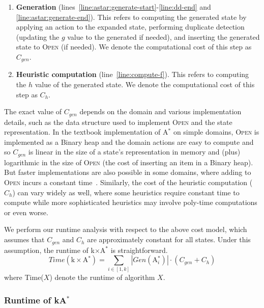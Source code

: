\documentclass{aicom2e}
\newcommand{\astar}{A$^*$}
\newcommand{\kastar}{kA$^*$}
\newcommand{\kxastar}{k$\times$A$^*$}
\newcommand{\astari}[1]{A$^*_#1$}
\newcommand{\open}{\textsc{Open}}
\begin{document}
\begin{enumerate}
    \item {\bf Generation}  (lines~\ref{line:astar:generate-start}-\ref{line:dd-end} and \ref{line:astar:generate-end}).
    This refers to computing the generated state by applying an action to the expanded state,
    performing duplicate detection (updating the $g$ value to the generated if needed),
    and inserting the generated state to \open{} (if needed).
    We denote the computational cost of this step as $C_{gen}$.


    \item {\bf Heuristic computation}  (line~\ref{line:compute-f}). This refers to computing the $h$ value of the generated state.
    We denote the computational cost of this step as $C_{h}$.
\end{enumerate}

The exact value of $C_{gen}$ depends on the domain and various implementation
details, such as the data structure used to implement \open{} and the state
representation. In the textbook implementation of \astar{} on simple domains,
\open{} is implemented as a Binary heap and the domain actions are easy to
compute and so $C_{gen}$ is linear in the size  of a state's representation in
memory and (plus) logarithmic in the size of \open{} (the cost of inserting an
item in a Binary heap). But faster implementations are also possible in some
domains, where adding to \open{} incurs a constant
time~\cite{GILON2016,BurnsHLR12}. Similarly, the cost of the heuristic
computation ($C_h$) can vary widely as well, where some heuristics require
constant time to compute while more sophisticated heuristics may involve
poly-time computations or even worse.



We perform our runtime analysis with respect to the above cost model,
which assumes that $C_{gen}$ and $C_h$ are approximately constant
for all states. Under this assumption, the runtime of \kxastar{} is straightforward.
\[
Time(\text{\kxastar{}}) = \sum_{i\in[1,k]} |Gen(\text{\astari{i}})|\cdot (C_{gen}+C_h)
\]
where Time($X$) denote the runtime of algorithm $X$.

\subsubsection{Runtime of \kastar{}}
\end{document}
